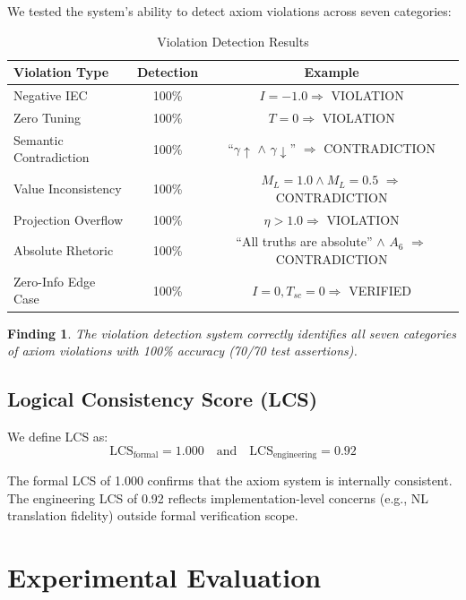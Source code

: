\documentclass[11pt,a4paper]{article}
\newtheorem*{finding}{Finding}
\begin{document}
We tested the system's ability to detect axiom violations across seven categories:

\begin{table}[h]
\centering
\caption{Violation Detection Results}
\label{tab:violations}
\begin{tabular}{@{}lcc@{}}
\toprule
\textbf{Violation Type} & \textbf{Detection} & \textbf{Example} \\
\midrule
Negative IEC   & 100\% & $I = -1.0 \Rightarrow$ VIOLATION \\
Zero Tuning    & 100\% & $T = 0 \Rightarrow$ VIOLATION \\
Semantic Contradiction & 100\% & ``$\gamma\uparrow$ $\wedge$ $\gamma\downarrow$'' $\Rightarrow$ CONTRADICTION \\
Value Inconsistency & 100\% & $M_L=1.0 \wedge M_L=0.5$ $\Rightarrow$ CONTRADICTION \\
Projection Overflow & 100\% & $\eta > 1.0 \Rightarrow$ VIOLATION \\
Absolute Rhetoric   & 100\% & ``All truths are absolute'' $\wedge$ $A_6$ $\Rightarrow$ CONTRADICTION \\
Zero-Info Edge Case  & 100\% & $I=0, T_{sc}=0 \Rightarrow$ VERIFIED \\
\bottomrule
\end{tabular}
\end{table}

\begin{finding}
The violation detection system correctly identifies all seven categories of axiom violations with 100\% accuracy (70/70 test assertions).
\end{finding}

\subsection{Logical Consistency Score (LCS)}

We define LCS as:
\[
\text{LCS}_{\text{formal}} = 1.000 \quad \text{and} \quad \text{LCS}_{\text{engineering}} = 0.92
\]

The formal LCS of 1.000 confirms that the axiom system is internally consistent. The engineering LCS of 0.92 reflects implementation-level concerns (e.g., NL translation fidelity) outside formal verification scope.

\section{Experimental Evaluation}\label{sec:experiments}
\end{document}
